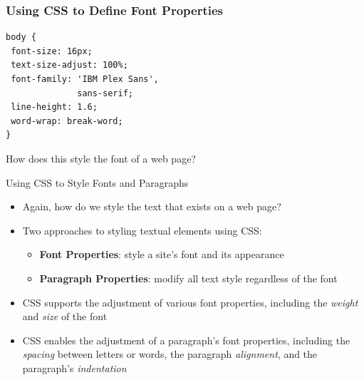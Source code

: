 \documentclass[14pt,aspectratio=169]{beamer}
\begin{document}
%
\begin{frame}[fragile]
  \frametitle{Using CSS to Define Font Properties}
  \normalsize
  \hspace*{.25in}
  \begin{minipage}{6in}
    \vspace*{.15in}
    \begin{verbatim}
body {
 font-size: 16px;
 text-size-adjust: 100%;
 font-family: 'IBM Plex Sans',
              sans-serif;
 line-height: 1.6;
 word-wrap: break-word;
}
    \end{verbatim}
  \end{minipage}
  \vspace*{-.05in}
  \begin{center}
    \noindent How does this style the font of a web page? \\
  \end{center}
\end{frame}

%
\begin{frame}{Using CSS to Style Fonts and Paragraphs}
  \begin{itemize}
    \item Again, how do we style the text that exists on a web page?
      \vspace*{-.2in}
    \item Two approaches to styling textual elements using CSS:
      \begin{itemize}
        \item {\bf Font Properties}: style a site's font and its appearance
        \item {\bf Paragraph Properties}: modify all text style regardless of
          the font
      \end{itemize}
      \vspace*{-.2in}
    \item CSS supports the adjustment of various font properties, including the
      {\em weight} and {\em size} of the font
      \vspace*{-.2in}
    \item CSS enables the adjustment of a paragraph's font properties, including
      the {\em spacing} between letters or words, the paragraph {\em alignment},
      and the paragraph's {\em indentation}
  \end{itemize}
\end{frame}
\end{document}
